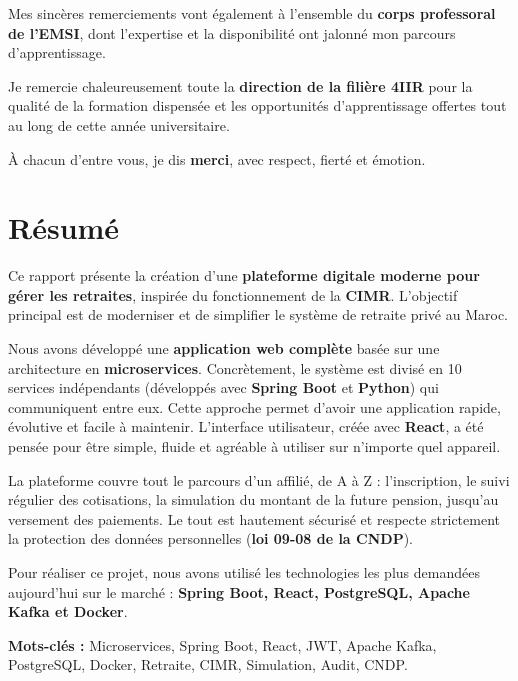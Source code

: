 \documentclass[12pt,a4paper,oneside]{report}
\begin{document}
Mes sincères remerciements vont également à l'ensemble du \textbf{corps professoral de l'EMSI}, dont l'expertise et la disponibilité ont jalonné mon parcours d'apprentissage.

Je remercie chaleureusement toute la \textbf{direction de la filière 4IIR} pour la qualité de la formation dispensée et les opportunités d'apprentissage offertes tout au long de cette année universitaire.

À chacun d'entre vous, je dis \textbf{merci}, avec respect, fierté et émotion.

\chapter*{Résumé}

Ce rapport présente la création d'une \textbf{plateforme digitale moderne pour gérer les retraites}, inspirée du fonctionnement de la \textbf{CIMR}. L'objectif principal est de moderniser et de simplifier le système de retraite privé au Maroc.

Nous avons développé une \textbf{application web complète} basée sur une architecture en \textbf{microservices}. Concrètement, le système est divisé en 10 services indépendants (développés avec \textbf{Spring Boot} et \textbf{Python}) qui communiquent entre eux. Cette approche permet d'avoir une application rapide, évolutive et facile à maintenir. L'interface utilisateur, créée avec \textbf{React}, a été pensée pour être simple, fluide et agréable à utiliser sur n'importe quel appareil.

La plateforme couvre tout le parcours d'un affilié, de A à Z : l'inscription, le suivi régulier des cotisations, la simulation du montant de la future pension, jusqu'au versement des paiements. Le tout est hautement sécurisé et respecte strictement la protection des données personnelles (\textbf{loi 09-08 de la CNDP}).

Pour réaliser ce projet, nous avons utilisé les technologies les plus demandées aujourd'hui sur le marché : \textbf{Spring Boot, React, PostgreSQL, Apache Kafka et Docker}.

\textbf{Mots-clés :} Microservices, Spring Boot, React, JWT, Apache Kafka, PostgreSQL, Docker, Retraite, CIMR, Simulation, Audit, CNDP.

\end{document}
